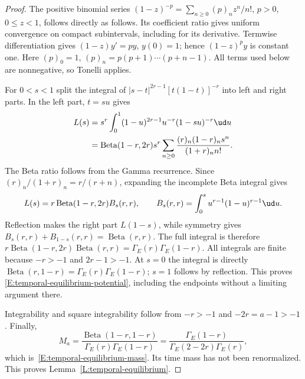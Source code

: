 \begin{proof}
  The positive binomial series
  $(1-z)^{-p}=\sum_{n\ge0}(p)_nz^n/n!$, $p>0$, $0\le z<1$,
  follows directly as follows. Its coefficient ratio gives uniform
  convergence on compact subintervals, including for its derivative.
  Termwise differentiation gives $(1-z)y'=py$, $y(0)=1$;
  hence $(1-z)^py$ is constant one. Here
  $(p)_0=1$, $(p)_n=p(p+1)\cdots(p+n-1)$.
  All terms used below are nonnegative, so Tonelli applies.

  For $0<s<1$ split the integral of
  $|s-t|^{2r-1}[t(1-t)]^{-r}$ into left and right parts.
  In the left part, $t=su$ gives
  \begin{align*}
    L(s)
    &=s^r\int_0^1(1-u)^{2r-1}u^{-r}(1-su)^{-r}\ud u\\
    &=\operatorname{Beta}(1-r,2r)s^r
    \sum_{n\ge0}
    \frac{(r)_n(1-r)_ns^n}{(1+r)_n n!}.
  \end{align*}
  The Beta ratio follows from the Gamma recurrence.
  Since $(r)_n/(1+r)_n=r/(r+n)$, expanding the incomplete Beta
  integral gives
  \[
    L(s)=r\operatorname{Beta}(1-r,2r)B_s(r,r),\qquad
    B_s(r,r)=\int_0^s u^{r-1}(1-u)^{r-1}\ud u.
  \]
  Reflection makes the right part $L(1-s)$, while symmetry gives
  $B_s(r,r)+B_{1-s}(r,r)=\operatorname{Beta}(r,r)$.
  The full integral is therefore
  $r\operatorname{Beta}(1-r,2r)\operatorname{Beta}(r,r)
  =\Gamma_E(r)\Gamma_E(1-r)$.
  All integrals are finite because $-r>-1$ and $2r-1>-1$.
  At $s=0$ the integral is directly
  $\operatorname{Beta}(r,1-r)=\Gamma_E(r)\Gamma_E(1-r)$;
  $s=1$ follows by reflection. This proves
  \eqref{E:temporal-equilibrium-potential}, including the endpoints
  without a limiting argument there.

  Integrability and square integrability follow from
  $-r>-1$ and $-2r=a-1>-1$. Finally,
  \[
    M_a=
    \frac{\operatorname{Beta}(1-r,1-r)}
    {\Gamma_E(r)\Gamma_E(1-r)}
    =\frac{\Gamma_E(1-r)}{\Gamma_E(2-2r)\Gamma_E(r)},
  \]
  which is~\eqref{E:temporal-equilibrium-mass}.
  Its time mass has not been renormalized.
  This proves Lemma~\ref{L:temporal-equilibrium}.
\end{proof}

